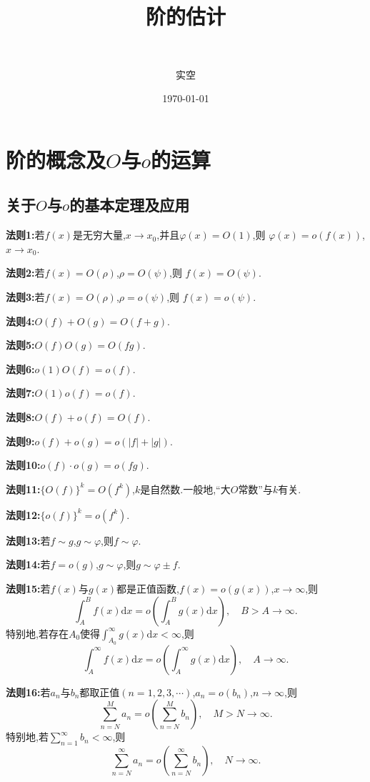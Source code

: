 \documentclass[lang=cn,newtx,10pt,scheme=chinese]{../Template/elegantbook}
\title{阶的估计}
\subtitle{\,\,}
\author{实空}
\institute{无}
\date{\today}
\begin{document}
\maketitle
\frontmatter

\tableofcontents

\mainmatter%

\chapter{阶的概念及$O$与$o$的运算}

\section{关于$O$与$o$的基本定理及应用}

\begin{theorem}[$O$与$o$的基本运算法则]\label{$O$与$o$的基本运算法则}
\textbf{法则1:}若\(f(x)\)是无穷大量,\(x\to x_0\),并且\(\varphi(x)=O(1)\),则
\(\varphi(x)=o(f(x))\),\(x\to x_0\).

\textbf{法则2:}若\(f(x)=O(\rho)\),\(\rho = O(\psi)\),则
\(f(x)=O(\psi)\).

\textbf{法则3:}若\(f(x)=O(\rho)\),\(\rho = o(\psi)\),则
\(f(x)=o(\psi)\).

\textbf{法则4:}\(O(f)+O(g)=O(f + g)\).

\textbf{法则5:}\(O(f)O(g)=O(fg)\).

\textbf{法则6:}\(o(1)O(f)=o(f)\).

\textbf{法则7:}\(O(1)o(f)=o(f)\).

\textbf{法则8:}\(O(f)+o(f)=O(f)\).

\textbf{法则9:}\(o(f)+o(g)=o(|f|+|g|)\).

\textbf{法则10:}\(o(f)\cdot o(g)=o(fg)\).

\textbf{法则11:}\(\{O(f)\}^k = O(f^k)\),\(k\)是自然数.一般地,“大\(O\)常数”与\(k\)有关.

\textbf{法则12:}\(\{o(f)\}^k = o(f^k)\).

\textbf{法则13:}若\(f\sim g\),\(g\sim\varphi\),则\(f\sim\varphi\).

\textbf{法则14:}若\(f = o(g)\),\(g\sim\varphi\),则\(g\sim\varphi\pm f\).

\textbf{法则15:}若\(f(x)\)与\(g(x)\)都是正值函数,\(f(x)=o(g(x))\),\(x\to\infty\),则
\[
\int_{A}^{B}f(x)\mathrm{d}x = o\left(\int_{A}^{B}g(x)\mathrm{d}x\right),\quad B > A\to\infty.
\]
特别地,若存在\(A_0\)使得\(\int_{A_0}^{\infty}g(x)\mathrm{d}x<\infty\),则
\[
\int_{A}^{\infty}f(x)\mathrm{d}x = o\left(\int_{A}^{\infty}g(x)\mathrm{d}x\right),\quad A\to\infty.
\]

\textbf{法则16:}若\(a_n\)与\(b_n\)都取正值\((n = 1,2,3,\cdots)\),\(a_n=o(b_n)\),\(n\to\infty\),则
\[
\sum_{n = N}^{M}a_n = o\left(\sum_{n = N}^{M}b_n\right),\quad M > N\to\infty.
\]
特别地,若\(\sum_{n = 1}^{\infty}b_n<\infty\),则
\[
\sum_{n = N}^{\infty}a_n = o\left(\sum_{n = N}^{\infty}b_n\right),\quad N\to\infty.
\]
\end{theorem}
\end{document}

